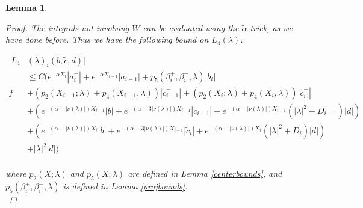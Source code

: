 \documentclass[12pt]{article}
\newtheorem{lemma}{Lemma}
\begin{document}
\begin{lemma}
\begin{proof}
The integrals not involving $W$ can be evaluated using the $\tilde{\alpha}$ trick, as we have done before. Thus we have the following bound on $L_4(\lambda)$. 

\begin{align*}
|L_4&(\lambda)_i(b, \tilde{c}, d)|\\ 
&\leq C \Big( e^{-\alpha X_i} |a_i^+| +  e^{-\alpha X_{i-1}} |a_{i-1}^-| + p_5(\beta_i^+, \beta_i^-, \lambda) |b_i| \\f
&+ (p_2(X_{i-1}; \lambda) + p_4(X_{i-1}, \lambda)) |\tilde{c}_{i-1}^-| 
+ (p_2(X_i; \lambda) + p_4(X_i, \lambda)) |\tilde{c}_i^+| \\
&+ ( e^{-(\alpha - |\nu(\lambda)|) X_{i-1}} |b| + e^{-(\alpha - 3 |\nu(\lambda)|) X_{i-1}}|\tilde{c}_{i-1}| + e^{-(\alpha - |\nu(\lambda)|) X_{i-1}} (|\lambda|^2 + D_{i-1})|d| ) \\
&+ ( e^{-(\alpha - |\nu(\lambda)|) X_i} |b| + e^{-(\alpha - 3 |\nu(\lambda)|) X_{i-1}}|\tilde{c}_i| + e^{-(\alpha - |\nu(\lambda)|) X_i} (|\lambda|^2 + D_i)|d| )  \\
&+ |\lambda|^2 |d| \Big)\\
\end{align*}

where $p_2(X; \lambda)$ and $p_5(X; \lambda)$ are defined in Lemma \ref{centerbounds}, and $p_5(\beta_i^+, \beta_i^-, \lambda)$ is defined in Lemma \ref{projbounds}.\\


\end{proof}
\end{lemma}
\end{document}
